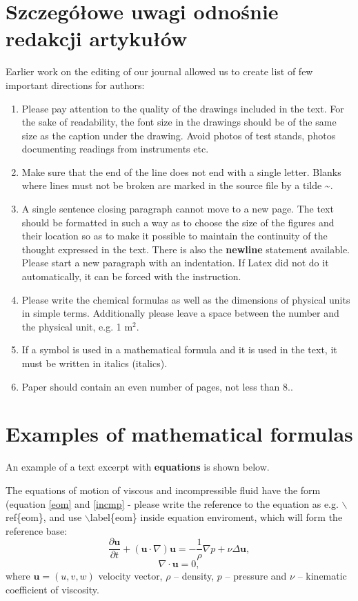 \documentclass[polish,twoside]{article}
\begin{document}
\section{Szczegółowe uwagi odnośnie redakcji artykułów}
Earlier work on the editing of our journal allowed us to create list of few important directions for authors:
\begin{enumerate}
    \item Please pay attention to the quality of the drawings included in the text. For the sake of readability, the font size in the drawings should be of the same size as the caption under the drawing. Avoid photos of test stands, photos documenting readings from instruments etc.
    \item Make sure that the end of the line does not end with a single letter. Blanks where lines must not be broken are marked in the source file by a tilde \~{}.
    \item  A single sentence closing paragraph cannot move to a new page. The text should be formatted in such a way as to choose the size of the figures and their location so as to make it possible to maintain the continuity of the thought expressed in the text. There is also the \textbf{newline} statement available. Please start a new paragraph with an indentation. If Latex did not do it automatically, it can be forced with the \indent instruction.
    \item Please write the chemical formulas as well as the dimensions of physical units in simple terms. Additionally please leave a space between the number and the physical unit, e.g. 1 m$^2$. 
    \item If a symbol is used in a mathematical formula and it is used in the text, it must be written in italics (italics).
    \item Paper should contain an even number of pages, not less than 8.. 
\end{enumerate}

\section{Examples of mathematical formulas}
An example of a text excerpt with \textbf{equations} is shown below.

The equations of motion of viscous and incompressible fluid have the form (equation \ref{eom} and \ref{incmp} - please write the reference to the equation as e.g. $\backslash$ref\{eom\}, and use $\backslash$label\{eom\} inside equation enviroment, which will form the reference base:
\begin{equation}\label{eom}
\frac{\partial{\mathbf{u}}}{\partial t}+(\mathbf{u} \cdot \nabla)\mathbf{u}=-\frac{1}{\rho}\nabla p+\nu \Delta \mathbf{u},
\end{equation}
\begin{equation}\label{incmp}
\nabla \cdot \mathbf{u}=0,
\end{equation}
where $\mathbf{u}=(u,v,w)$ velocity vector, $\rho$ -- density, $p$ -- pressure and $\nu$ -- kinematic coefficient of viscosity.
\end{document}
